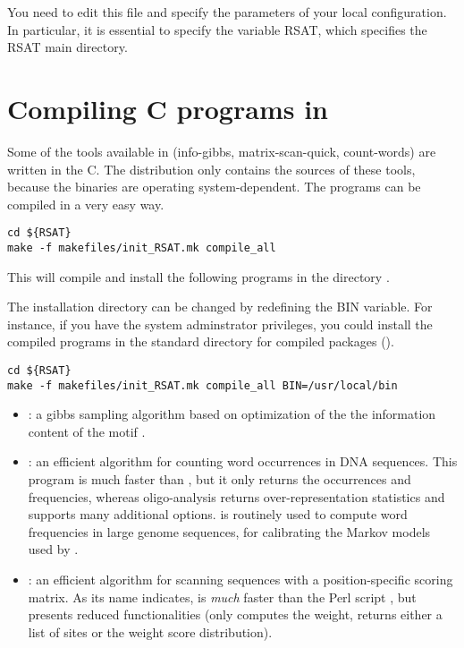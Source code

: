 \documentclass{book}
\begin{document}
You need to edit this file and specify the parameters of your local
configuration. In particular, it is essential to specify the variable
RSAT, which specifies the RSAT main directory.

\section{Compiling C programs in \RSAT}

Some of the tools available in \RSAT (info-gibbs, matrix-scan-quick,
count-words) are written in the C. The distribution only contains
the sources of these tools, because the binaries are operating
system-dependent. The programs can be compiled in a very easy way.

\begin{footnotesize}
\begin{verbatim}
cd ${RSAT}
make -f makefiles/init_RSAT.mk compile_all
\end{verbatim}
\end{footnotesize}

This will compile and install the following programs in the directory
. 

The installation directory can be changed by redefining the BIN
variable. For instance, if you have the system adminstrator
privileges, you could install the compiled programs in the standard
directory for compiled packages ().

\begin{footnotesize}
\begin{verbatim}
cd ${RSAT}
make -f makefiles/init_RSAT.mk compile_all BIN=/usr/local/bin
\end{verbatim}
\end{footnotesize}


\begin{itemize}
\item {}: a gibbs sampling algorithm based on
  optimization of the the information content of the motif
  \cite{Defrance:2009}.

\item {}: an efficient algorithm for counting word
  occurrences in DNA sequences. This program is much faster than
  , but it only returns the occurrences and
  frequencies, whereas oligo-analysis returns over-representation
  statistics and supports many additional
  options.  is routinely used to compute word
  frequencies in large genome sequences, for calibrating the Markov
  models used by .

\item {}: an efficient algorithm for scanning
  sequences with a position-specific scoring matrix. As its name
  indicates,  is \emph{much} faster than
  the Perl script , but presents reduced
  functionalities (only computes the weight, returns either a list of
  sites or the weight score distribution).
\end{itemize}
\end{document}
